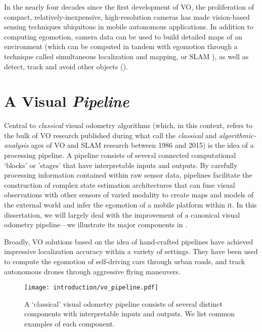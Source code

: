  
In the nearly four decades since the first development of VO, the proliferation of compact, relatively-inexpensive, high-resolution cameras has made vision-based sensing techniques ubiquitous in mobile autonomous applications. In addition to computing egomotion, camera data can be used to build detailed maps of an environment (which can be computed in tandem with egomotion through a technique called simultaneous localization and mapping, or SLAM \citep{Cadena2016-ds}), as well as detect, track and avoid other objects (). 

\section{A Visual \textit{Pipeline}}


Central to \textit{classical} visual odometry algorithms (which, in this context, refers to the bulk of VO research published during what \cite{Cadena2016-ds} call the \textit{classical} and \textit{algorithmic-analysis} ages of VO and SLAM research between 1986 and 2015) is the idea of a processing pipeline. A  pipeline consists of several connected computational `blocks' or 'stages' that have interpretable inputs and outputs.  By carefully processing information contained within raw sensor data, pipelines facilitate the construction of complex state estimation architectures that can fuse visual observations with other sensors of varied modality to create maps and models of the external world and infer the egomotion of a mobile platform within it. In this dissertation, we will largely deal with the improvement of a canonical visual odometry pipeline---we illustrate its major components in . 

Broadly, VO solutions based on the idea of hand-crafted pipelines \citep{Leutenegger2015-fk, Cvisic2015-mt, Tsotsos2015, Alcantarilla2016-kv, forster2014svo, wang_stereo_2017, engel_direct_2018} have achieved impressive localization accuracy within a variety of settings. They have been used to compute the egomotion of self-driving cars through urban roads, and track autonomous drones through aggressive flying maneuvers. 

\begin{figure}
\begin{center}
		\texttt{[image: introduction/vo\_pipeline.pdf]}
		\caption{A `classical' visual odometry pipeline consists of several distinct components with interpretable inputs and outputs. We list common examples of each component. }
  	\label{fig:intro_vo_pipeline}
\end{center}
\end{figure}


